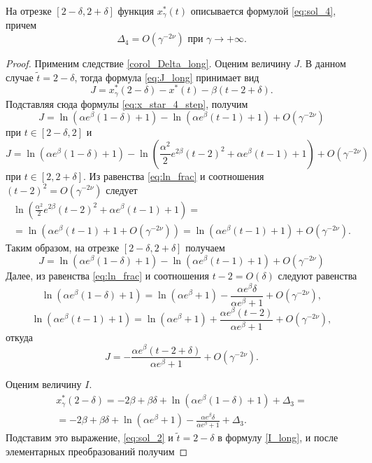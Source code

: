 \begin{lemma}
\label{lem_Delta4}
На отрезке $[2 - \delta, 2 + \delta]$ функция $x_\gamma^*(t)$ описывается формулой \eqref{eq:sol_4}, причем
\[
	\Delta_4 = O(\gamma^{-2\nu}) \text{ при } \gamma \to +\infty.
\]
\end{lemma}

\begin{proof}

Применим следствие \ref{corol_Delta_long}. Оценим величину $J$. В данном случае $\tilde{t} = 2 - \delta$, тогда формула \eqref{eq:J_long} принимает вид
%
\[
J = x_\gamma^*(2 - \delta) - x^*(t) - \beta(t - 2 + \delta).
\]
%
Подставляя сюда формулы \eqref{eq:x_star_4_step}, получим
%
\[
	J = \ln(\alpha e^{\beta} (1 - \delta) + 1) - \ln(\alpha e^{\beta}(t - 1) + 1) + O(\gamma^{-2\nu})
\]
при $t\in [2 - \delta, 2]$ и
%
\[
	J = \ln(\alpha e^{\beta} (1 - \delta) + 1) - \ln \left(\frac{\alpha^2}{2}e^{2\beta}(t-2)^2  + \alpha e^{\beta}(t-1)+1 \right) + O(\gamma^{-2\nu})
\]
при $t\in [2, 2 + \delta].$
%
Из равенства \eqref{eq:ln_frac} и соотношения $(t - 2)^2 = O(\gamma^{-2\nu})$ следует
\begin{multline*}
\ln \left(\frac{\alpha^2}{2} e^{2\beta} (t - 2)^2  + \alpha e^{\beta}(t - 1) + 1 \right) =\\= \ln (\alpha e^{\beta}(t - 1) + 1 + O(\gamma^{-2\nu})) = \ln (\alpha e^{\beta}(t - 1) + 1) + O(\gamma^{-2\nu}).
\end{multline*}
%
Таким образом, на отрезке $[2 - \delta, 2 + \delta]$ получаем
%
\[
J = \ln(\alpha e^{\beta} (1 - \delta) + 1) - \ln(\alpha e^{\beta}(t - 1) + 1) + O(\gamma^{-2\nu})
\]
%
Далее, из равенства \eqref{eq:ln_frac} и соотношения $t - 2 = O(\delta)$ следуют равенства
\[
 \ln(\alpha e^{\beta} (1 - \delta) + 1) = \ln(\alpha e^{\beta} + 1) - \frac{\alpha e^{\beta}\delta}{\alpha e^{\beta} + 1} + O(\gamma^{-2\nu}),
\]
\[
\ln(\alpha e^{\beta} (t - 1) + 1) = \ln(\alpha e^{\beta} + 1) + \frac{\alpha e^{\beta} (t - 2)}{\alpha e^{\beta} + 1} + O(\gamma^{-2\nu}),
\]
откуда
\begin{equation}
\label{eq:J_step4}
J = -\frac{\alpha e^{\beta} (t - 2 + \delta)}{\alpha e^{\beta} + 1} + O(\gamma^{-2\nu}).
\end{equation}

Оценим величину $I$.
%
\begin{multline*}
x_\gamma^*(2 - \delta) = -2\beta + \beta \delta + \ln(\alpha e^{\beta}(1 - \delta) + 1) + \Delta_3 =\\
= -2 \beta + \beta \delta + \ln(\alpha e^{\beta} + 1) - \frac{\alpha e^{\beta}\delta}{\alpha e^\beta + 1} +\Delta_3.
\end{multline*}
%
Подставим это выражение, \eqref{eq:sol_2} и $\tilde{t} = 2 - \delta$ в формулу \eqref{I_long}, и после элементарных преобразований получим


\end{proof}
